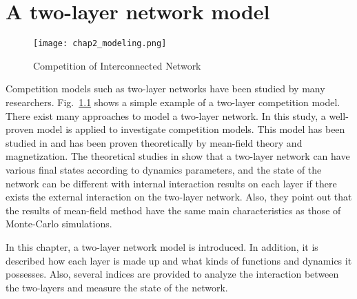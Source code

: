 
\chapter{A two-layer network model}
\label{chap2}

\begin{figure}[!htb]
	\centering
	\texttt{[image: chap2\_modeling.png]}
	\caption{Competition of Interconnected Network}
	\label{chap2_modeling}
\end{figure}

Competition models such as two-layer networks have been studied by many researchers. Fig.~\ref{chap2_modeling}  shows a simple example of a two-layer competition model. There exist many approaches to model a two-layer network. In this study, a well-proven model is applied to investigate competition models. This model has been studied in \parencite{diep2017, alvarez2016, gomez2015} and has been proven theoretically by mean-field theory and magnetization\parencite{amato2017, diep2017, alvarez2016, gomez2015}. The theoretical studies in \parencite{diep2017, alvarez2016, gomez2015} show that a two-layer network can have various final states according to dynamics parameters, and the state of the network can be different with internal interaction results on each layer if there exists the external interaction on the two-layer network. Also, they point out that the results of mean-field method have the same main characteristics as those of Monte-Carlo simulations.

In this chapter, a two-layer network model is introduced. In addition, it is described how each layer is made up and what kinds of functions and dynamics it possesses. Also, several indices are provided to analyze the interaction between the two-layers and measure the state of the network. 
 
